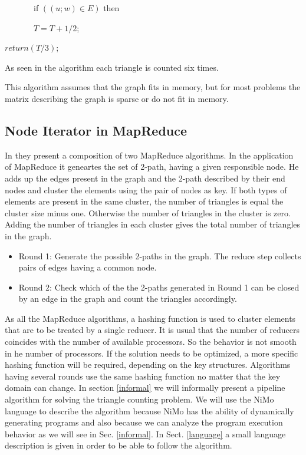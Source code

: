 \documentclass{article}                     \usepackage{graphics}
\begin{document}
\ \ \ \ \ \ \ if $((u;w) \in E)$ then

\ \ \ \ \ \ \ $T = T + 1/2$;

$return(T/3)$;

As seen in the algorithm each triangle is counted six times.

This algorithm assumes that the graph fits in memory, but for most problems the matrix describing the graph  is sparse or do not fit in memory.  
\subsection{Node Iterator in MapReduce}

In \cite{Suri:2011:CTC:1963405.1963491}  they present a composition of  two  MapReduce algorithms. In the application of MapReduce it geneartes  the set of 2-path, having a given responsible node.  He adds up the edges present in the graph and  the 2-path described by  their end nodes and cluster the elements using the pair of nodes as key. If both types of elements  are present in the same cluster, the number of triangles is equal the cluster size minus one. Otherwise the number of triangles in the cluster is zero. Adding the number of triangles in each cluster gives the total  number of triangles in the graph.  
\begin{itemize}
\item Round 1: Generate the possible  2-paths in
the graph.  The reduce step collects pairs of edges having a common node.
\item Round 2: Check which of the the 2-paths generated
in Round 1 can be closed by an edge in the graph
and count the triangles accordingly.
\end{itemize}

As all the MapReduce algorithms, a hashing function is used  to cluster elements that are to be treated by a single reducer.  It is usual that the number of reducers coincides with the number of available processors. So the behavior is not smooth   in he number of processors.  If the solution needs to be optimized, a more specific hashing function will be required, depending on the key structures. Algorithms having several rounds use the same hashing function no matter that the key domain can change.   In section \ref{informal} we will informally  present a pipeline algorithm for solving the triangle counting problem. We will use the  NiMo language to describe the algorithm because NiMo has the ability of dynamically generating programs and also because we can analyze the program execution  behavior as we will see in Sec. \ref{informal}. In Sect. \ref{language} a small language description is given in order to be able to follow the algorithm.
\end{document}

